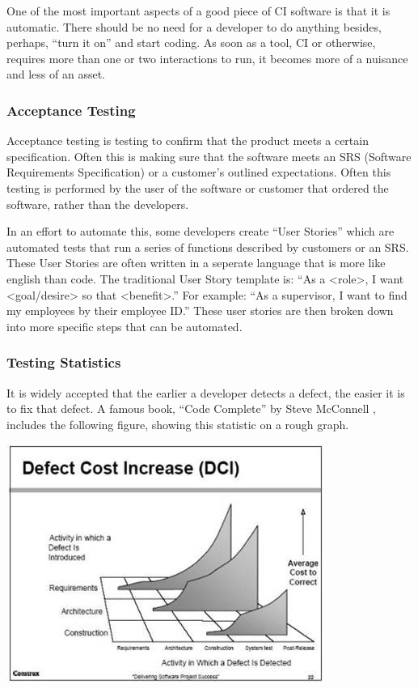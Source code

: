 \documentclass[11pt]{article}
\newenvironment{Figure}
  {\par\medskip\noindent\minipage{\linewidth}}
  {\endminipage\par\medskip}
\begin{document}
One of the most important aspects of a good piece of CI software is that it is automatic. There should be no need for a developer to do anything besides, perhaps, ``turn it on'' and start coding. As soon as a tool, CI or otherwise, requires more than one or two interactions to run, it becomes more of a nuisance and less of an asset.

\subsubsection{Acceptance Testing}
Acceptance testing is testing to confirm that the product meets a certain specification. Often this is making sure that the software meets an SRS (Software Requirements Specification) or a customer's outlined expectations. Often this testing is performed by the user of the software or customer that ordered the software, rather than the developers.

In an effort to automate this, some developers create ``User Stories'' which are automated tests that run a series of functions described by customers or an SRS. These User Stories are often written in a seperate language that is more like english than code. The traditional User Story template is: ``As a <role>, I want <goal/desire> so that <benefit>.'' For example: ``As a supervisor, I want to find my employees by their employee ID.'' These user stories are then broken down into more specific steps that can be automated.

\subsubsection{Testing Statistics}
It is widely accepted that the earlier a developer detects a defect, the easier it is to fix that defect. A famous book, ``Code Complete'' by Steve McConnell \cite{DefectPic}, includes the following figure, showing this statistic on a rough graph.

\begin{Figure}
	\centering
	\includegraphics[width=0.75\linewidth]{defectcost.jpg} 
\end{Figure}
\end{document}
